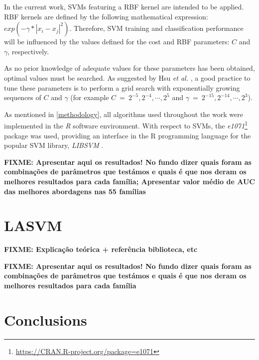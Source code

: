 \documentclass[11pt]{article}
\begin{document}
In the current work, SVMs featuring a RBF kernel are intended to be applied. RBF kernels are defined by the following mathematical expression: $exp(- \gamma * |x_{i}-x_{j}|^2) $. Therefore, SVM training and classification performance will be influenced by the values defined for the cost and RBF parameters: $C$ and $\gamma$, respectively.

As no prior knowledge of adequate values for these parameters has been obtained, optimal values must be searched. As suggested by Hsu \emph{et al.} \cite{hsu2003practical}, a good practice to tune these parameters is to perform a grid search with exponentially growing sequences of $C$ and $\gamma$ (for example $C \: = \: 2^{-5}, 2^{-4}, \cdots , 2^{5}$ and $\gamma \: = \: 2^{-15}, 2^{-14}, \cdots , 2^{3}$).

As mentioned in \ref{methodology}, all algorithms used throughout the work were implemented in the \emph{R} software environment. With respect to SVMs, the \emph{e1071}\footnote{\url{https://CRAN.R-project.org/package=e1071}} package was used, providing an interface in the R programming language for the popular SVM library, \emph{LIBSVM} \cite{CC01a}.

\textbf{FIXME: Apresentar aqui os resultados! No fundo dizer quais foram as combinações de parâmetros que testámos e quais é que nos deram os melhores resultados para cada família; Apresentar valor médio de AUC das melhores abordagens nas 55 famílias}

\section{LASVM}
\label{lasvm}

\textbf{FIXME: Explicação teórica + referência biblioteca, etc}


\textbf{FIXME: Apresentar aqui os resultados! No fundo dizer quais foram as combinações de parâmetros que testámos e quais é que nos deram os melhores resultados para cada família}

\section{Conclusions}
\label{conclusions}



\end{document}
